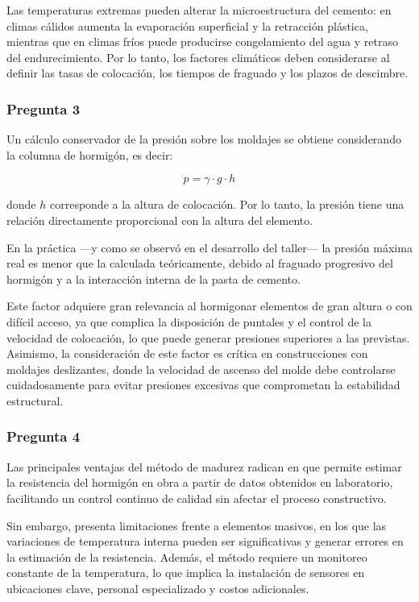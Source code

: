 Las temperaturas extremas pueden alterar la microestructura del cemento: en climas cálidos aumenta la evaporación superficial y la retracción plástica, mientras que en climas fríos puede producirse congelamiento del agua y retraso del endurecimiento.  
Por lo tanto, los factores climáticos deben considerarse al definir las tasas de colocación, los tiempos de fraguado y los plazos de descimbre.


\subsubsection*{Pregunta 3} 

Un cálculo conservador de la presión sobre los moldajes se obtiene considerando la columna de hormigón, es decir:

\begin{equation}
    p = \gamma \cdot g \cdot h
\end{equation}

donde $h$ corresponde a la altura de colocación. Por lo tanto, la presión tiene una relación directamente proporcional con la altura del elemento.  

En la práctica —y como se observó en el desarrollo del taller— la presión máxima real es menor que la calculada teóricamente, debido al fraguado progresivo del hormigón y a la interacción interna de la pasta de cemento.  

Este factor adquiere gran relevancia al hormigonar elementos de gran altura o con difícil acceso, ya que complica la disposición de puntales y el control de la velocidad de colocación, lo que puede generar presiones superiores a las previstas.  
Asimismo, la consideración de este factor es crítica en construcciones con moldajes deslizantes, donde la velocidad de ascenso del molde debe controlarse cuidadosamente para evitar presiones excesivas que comprometan la estabilidad estructural.


\subsubsection*{Pregunta 4} 

Las principales ventajas del método de madurez radican en que permite estimar la resistencia del hormigón en obra a partir de datos obtenidos en laboratorio, facilitando un control continuo de calidad sin afectar el proceso constructivo.  

Sin embargo, presenta limitaciones frente a elementos masivos, en los que las variaciones de temperatura interna pueden ser significativas y generar errores en la estimación de la resistencia. Además, el método requiere un monitoreo constante de la temperatura, lo que implica la instalación de sensores en ubicaciones clave, personal especializado y costos adicionales.  

